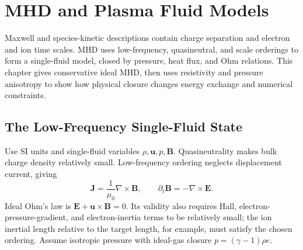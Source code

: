 \chapter{MHD and Plasma Fluid Models}\label{ch:18}
\begin{chaptersummary}
Maxwell and species-kinetic descriptions contain charge separation and electron and ion time scales. MHD uses low-frequency, quasineutral, and scale orderings to form a single-fluid model, closed by pressure, heat flux, and Ohm relations. This chapter gives conservative ideal MHD, then uses resistivity and pressure anisotropy to show how physical closure changes energy exchange and numerical constraints.
\end{chaptersummary}

\section{The Low-Frequency Single-Fluid State}
Use SI units and single-fluid variables $\rho,\bm u,p,\bm B$.
Quasineutrality makes bulk charge density relatively small. Low-frequency ordering neglects displacement current, giving
\[
\bm J=\frac1{\mu_0}\nabla\times\bm B,\qquad
\partial_t\bm B=-\nabla\times\bm E.
\]
Ideal Ohm's law is $\bm E+\bm u\times\bm B=0$.
Its validity also requires Hall, electron-pressure-gradient, and electron-inertia terms to be relatively small;
the ion inertial length relative to the target length, for example, must satisfy the chosen ordering.
Assume isotropic pressure with ideal-gas closure $p=(\gamma-1)\rho e$.

